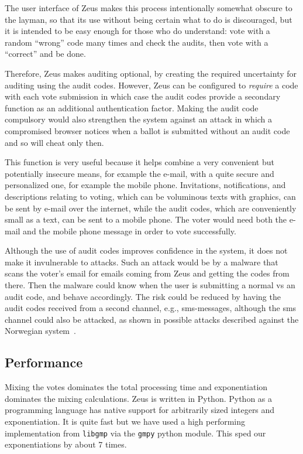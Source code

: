 \documentclass[jets]{usenixjournal}
\begin{document}
The user interface of Zeus makes this process intentionally somewhat
obscure to the layman, so that its use without being certain what to
do is discouraged, but it is intended to be easy enough for those who
do understand: vote with a random ``wrong'' code many times and check
the audits, then vote with a ``correct'' and be done.

Therefore, Zeus makes auditing optional, by creating the required
uncertainty for auditing using the audit codes.
However, Zeus can be configured to \emph{require} a code with each vote
submission in which case the audit codes provide a secondary function
as an additional authentication factor. Making the audit code
compulsory would also strengthen the system against an attack in which
a compromised browser notices when a ballot is submitted without an
audit code and so will cheat only then.

This function is very useful because it helps combine a very convenient
but potentially insecure means, for example the e-mail,
with a quite secure and personalized one, for example the mobile phone.
Invitations, notifications, and descriptions relating to voting,
which can be voluminous texts with graphics,
can be sent by e-mail over the internet,
while the audit codes, which are conveniently small as a text,
can be sent to a mobile phone.
The voter would need both the e-mail and the mobile phone message in
order to vote successfully.

Although the use of audit codes improves confidence in the system, it
does not make it invulnerable to attacks. Such an attack would be by a
malware that scans the voter's email for emails coming from Zeus and
getting the codes from there. Then the malware could know when the
user is submitting a normal vs an audit code, and behave accordingly.
The risk could be reduced by having the audit codes received from a
second channel, e.g., {\sc sms}-messages, although the {\sc sms}
channel could also be attacked, as shown in possible attacks described
against the Norwegian system~\cite{koenig:2013}.


\subsection{Performance}
\label{sec:performance}
Mixing the votes dominates the total processing time
and exponentiation dominates the mixing calculations.
Zeus is written in Python. 
Python as a programming language has native support for arbitrarily
sized integers and exponentiation.
It is quite fast but we have used a high performing implementation
from \texttt{libgmp} via the \texttt{gmpy} python module.
This sped our exponentiations by about 7 times.
\end{document}

